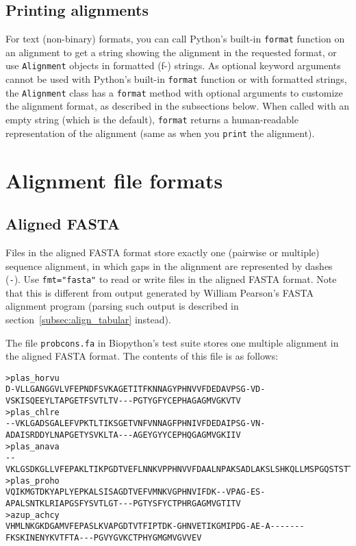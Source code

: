 \subsection{Printing alignments}

For text (non-binary) formats, you can call Python's built-in \verb|format| function on an alignment to get a string showing the alignment in the requested format, or use \verb|Alignment| objects in formatted (f-) strings. As optional keyword arguments cannot be used with Python's built-in \verb|format| function or with formatted strings, the \verb|Alignment| class has a \verb|format| method with optional arguments to customize the alignment format, as described in the subsections below. When called with an empty string (which is the default), \verb|format| returns a human-readable representation of the alignment (same as when you \verb|print| the alignment).

\section{Alignment file formats}
\label{sec:alignformats}

\subsection{Aligned FASTA}
\label{subsec:align_fasta}

Files in the aligned FASTA format store exactly one (pairwise or multiple) sequence alignment, in which gaps in the alignment are represented by dashes (\verb|-|). Use \verb|fmt="fasta"| to read or write files in the aligned FASTA format. Note that this is different from output generated by William Pearson's FASTA alignment program (parsing such output is described in section~\ref{subsec:align_tabular} instead).

The file \verb+probcons.fa+ in Biopython's test suite stores one multiple alignment in the aligned FASTA format. The contents of this file is as follows:
\begin{verbatim}
>plas_horvu
D-VLLGANGGVLVFEPNDFSVKAGETITFKNNAGYPHNVVFDEDAVPSG-VD-VSKISQEEYLTAPGETFSVTLTV---PGTYGFYCEPHAGAGMVGKVTV
>plas_chlre
--VKLGADSGALEFVPKTLTIKSGETVNFVNNAGFPHNIVFDEDAIPSG-VN-ADAISRDDYLNAPGETYSVKLTA---AGEYGYYCEPHQGAGMVGKIIV
>plas_anava
--VKLGSDKGLLVFEPAKLTIKPGDTVEFLNNKVPPHNVVFDAALNPAKSADLAKSLSHKQLLMSPGQSTSTTFPADAPAGEYTFYCEPHRGAGMVGKITV
>plas_proho
VQIKMGTDKYAPLYEPKALSISAGDTVEFVMNKVGPHNVIFDK--VPAG-ES-APALSNTKLRIAPGSFYSVTLGT---PGTYSFYCTPHRGAGMVGTITV
>azup_achcy
VHMLNKGKDGAMVFEPASLKVAPGDTVTFIPTDK-GHNVETIKGMIPDG-AE-A-------FKSKINENYKVTFTA---PGVYGVKCTPHYGMGMVGVVEV
\end{verbatim}

